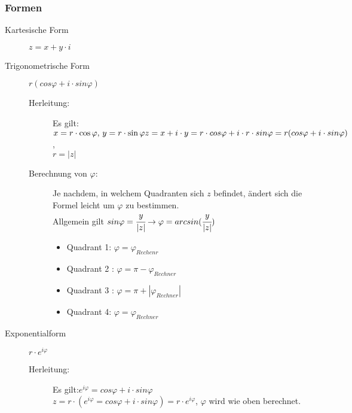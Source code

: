 \documentclass[a4paper]{scrartcl}
\begin{document}
            \subsubsection{Formen}    
                \begin{description}
                    \item[Kartesische Form] $z = x + y \cdot i$
                    \item[Trigonometrische Form]   $r(cos\varphi + i \cdot sin\varphi)$
                    \begin{description}
                        \item[Herleitung:]  Es gilt: \(x = r  \cdot  \cos\varphi, \, y = r  \cdot  \sin\varphi \\
                        z = x + i \cdot y = r  \cdot  cos\varphi + i  \cdot  r \cdot  sin\varphi = r(cos\varphi + i \cdot sin\varphi) \), 
                        \\ $r = |z|$ 
                        \item[Berechnung von $\varphi$:] Je nachdem, in welchem Quadranten sich $z$ befindet, ändert sich die Formel leicht um $\varphi$ zu bestimmen.\\
                            Allgemein gilt $sin \varphi = \cfrac{y}{|z|} \rightarrow \varphi = arcsin(\cfrac{y}{|z|})$
                        \begin{itemize}
                            \item Quadrant 1: $\varphi = \varphi_{Rechenr}$
                            \item Quadrant 2 : $\varphi = \pi - \varphi_{Rechner}$
                            \item Quadrant 3 : $\varphi = \pi + |\varphi_{Rechner}|$
                            \item Quadrant 4: $\varphi = \varphi_{Rechner}$
                        \end{itemize}
                    \end{description}
                    \newpage
                    \item[Exponentialform] $r  \cdot  e^{i\varphi}$ 
                    \begin{description}
                        \item[Herleitung:] Es gilt:\(e^{i\varphi} = cos\varphi + i  \cdot  sin\varphi \) \\ \(z = r  \cdot  (e^{i\varphi} = cos\varphi + i  \cdot  sin\varphi) = r  \cdot  e^{i\varphi} \), $\varphi$ wird wie oben berechnet.
                    \end{description}
                \end{description}          
\end{document}
